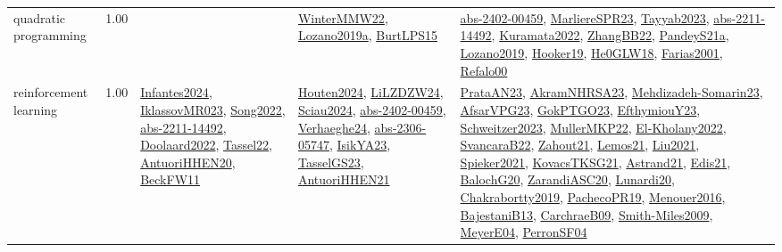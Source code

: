 {\begin{longtable}{p{3cm}r>{\raggedright\arraybackslash}p{6cm}>{\raggedright\arraybackslash}p{6cm}>{\raggedright\arraybackslash}p{8cm}}
\index{quadratic programming}\index{Algorithms!quadratic programming}quadratic programming &  1.00 &  & \hyperref[detail:WinterMMW22]{WinterMMW22}, \hyperref[detail:Lozano2019a]{Lozano2019a}, \hyperref[detail:BurtLPS15]{BurtLPS15} & \hyperref[detail:abs-2402-00459]{abs-2402-00459}, \hyperref[detail:MarliereSPR23]{MarliereSPR23}, \hyperref[detail:Tayyab2023]{Tayyab2023}, \hyperref[detail:abs-2211-14492]{abs-2211-14492}, \hyperref[detail:Kuramata2022]{Kuramata2022}, \hyperref[detail:ZhangBB22]{ZhangBB22}, \hyperref[detail:PandeyS21a]{PandeyS21a}, \hyperref[detail:Lozano2019]{Lozano2019}, \hyperref[detail:Hooker19]{Hooker19}, \hyperref[detail:He0GLW18]{He0GLW18}, \hyperref[detail:Farias2001]{Farias2001}, \hyperref[detail:Refalo00]{Refalo00}\\
\index{reinforcement learning}\index{Algorithms!reinforcement learning}reinforcement learning &  1.00 & \hyperref[detail:Infantes2024]{Infantes2024}, \hyperref[detail:IklassovMR023]{IklassovMR023}, \hyperref[detail:Song2022]{Song2022}, \hyperref[detail:abs-2211-14492]{abs-2211-14492}, \hyperref[detail:Doolaard2022]{Doolaard2022}, \hyperref[detail:Tassel22]{Tassel22}, \hyperref[detail:AntuoriHHEN20]{AntuoriHHEN20}, \hyperref[detail:BeckFW11]{BeckFW11} & \hyperref[detail:Houten2024]{Houten2024}, \hyperref[detail:LiLZDZW24]{LiLZDZW24}, \hyperref[detail:Sciau2024]{Sciau2024}, \hyperref[detail:abs-2402-00459]{abs-2402-00459}, \hyperref[detail:Verhaeghe24]{Verhaeghe24}, \hyperref[detail:abs-2306-05747]{abs-2306-05747}, \hyperref[detail:IsikYA23]{IsikYA23}, \hyperref[detail:TasselGS23]{TasselGS23}, \hyperref[detail:AntuoriHHEN21]{AntuoriHHEN21} & \hyperref[detail:PrataAN23]{PrataAN23}, \hyperref[detail:AkramNHRSA23]{AkramNHRSA23}, \hyperref[detail:Mehdizadeh-Somarin23]{Mehdizadeh-Somarin23}, \hyperref[detail:AfsarVPG23]{AfsarVPG23}, \hyperref[detail:GokPTGO23]{GokPTGO23}, \hyperref[detail:EfthymiouY23]{EfthymiouY23}, \hyperref[detail:Schweitzer2023]{Schweitzer2023}, \hyperref[detail:MullerMKP22]{MullerMKP22}, \hyperref[detail:El-Kholany2022]{El-Kholany2022}, \hyperref[detail:SvancaraB22]{SvancaraB22}, \hyperref[detail:Zahout21]{Zahout21}, \hyperref[detail:Lemos21]{Lemos21}, \hyperref[detail:Liu2021]{Liu2021}, \hyperref[detail:Spieker2021]{Spieker2021}, \hyperref[detail:KovacsTKSG21]{KovacsTKSG21}, \hyperref[detail:Astrand21]{Astrand21}, \hyperref[detail:Edis21]{Edis21}, \hyperref[detail:BalochG20]{BalochG20}, \hyperref[detail:ZarandiASC20]{ZarandiASC20}, \hyperref[detail:Lunardi20]{Lunardi20}, \hyperref[detail:Chakrabortty2019]{Chakrabortty2019}, \hyperref[detail:PachecoPR19]{PachecoPR19}, \hyperref[detail:Menouer2016]{Menouer2016}, \hyperref[detail:BajestaniB13]{BajestaniB13}, \hyperref[detail:CarchraeB09]{CarchraeB09}, \hyperref[detail:Smith-Miles2009]{Smith-Miles2009}, \hyperref[detail:MeyerE04]{MeyerE04}, \hyperref[detail:PerronSF04]{PerronSF04}\\

\end{longtable}}
